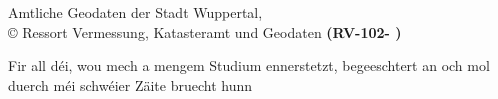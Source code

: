 


\newcommand{\incgraph}[2]{\IfFileExists{#2}{\texttt{[image: \#2]}}{\texttt{[image: ./img/dummy.png]}}}

\usepackage{rotating}
\addto{}
\usepackage{tabulary}
\usepackage{caption}
\usepackage{wrapfig}

\newcommand\blankpage{%
   \newpage
\thispagestyle{empty}
\mbox{}}

\newenvironment{dedica}
  {\clearpage           %
   \thispagestyle{empty}%
   \vspace*{\stretch{1}}%
   \itshape             %
   \raggedleft          %
  }
  {\par %
   \vspace{\stretch{3}} %
   \clearpage           %
  }

\usepackage[none]{hyphenat}
\pagestyle{empty}





\blankpage

\blankpage

\newpage
\vspace*{\fill}
Amtliche Geodaten der Stadt Wuppertal, \\
© Ressort Vermessung, Katasteramt und Geodaten \textbf{(RV-102- )}
\newpage
\blankpage


\blankpage

\begin{dedica}
Fir all déi, wou mech a mengem Studium ennerstetzt, begeeschtert an och mol duerch méi schwéier Zäite bruecht hunn
\end{dedica}


\tableofcontents






\nocite{bezk-alkis}

\begingroup
\sloppy
\singlespacing
\printbibliography
\endgroup

\begingroup
\singlespacing

\endgroup
\listoffigures
\listoftables


 

